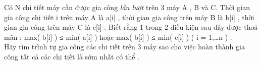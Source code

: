 Có N chi tiết máy cần được gia công   \textit{    lần lượt   }   trên 3 máy A , B và C. Thời gian gia công chi tiết i trên máy A là  a[i] , thời gian gia công trên máy B là b[i] , thời gian gia công trên máy C là c[i] . Biết rằng 1 trong 2 điều kiện sau đây được thoả mãn : max( b[i] ) ≤ min( a[i] ) hoặc max( b[i] ) ≤ min( c[i] ) ( i = 1,…n ) .   
\\   Hãy tìm trình tự gia công các chi tiết trên 3 máy sao cho việc hoàn thành gia công tất cả các chi tiết là sớm nhất có thể .  

\